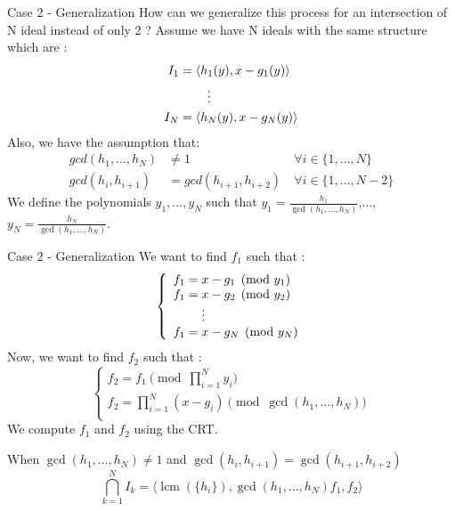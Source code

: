 \documentclass{beamer}
\DeclareMathOperator{\lcm}{lcm}
\begin{document}
\begin{frame}{Case 2 - Generalization}
How can we generalize this process for an intersection of N ideal instead of only 2 ?
Assume we have N ideals with the same structure which are :
\begin{align*}
    I_{1} & = \langle h_{1}(y),x-g_{1}(y) \rangle    \\
          & \hspace{8mm} \vdots                      \\
    I_{N} & = \langle h_{N}(y),x-g_{N}(y) \rangle
\end{align*}
Also, we have the assumption that: 
\begin{align*}
    gcd(h_{1},\dots,h_{N}) & \neq 1                 & \forall i \in \{1,\dots,N\} \\
    gcd(h_{i},h_{i+1})     & =gcd(h_{i+1},h_{i+2})\ & \forall i \in \{1,\dots,N-2\}
\end{align*}
 We define the polynomials $y_{1},\dots,y_{N}$ such that $y_{1} = \displaystyle \frac{h_{1}}{\gcd(h_{1},\dots,h_{N})}$,$\dots$, $y_{N} = \displaystyle \frac{h_{N}}{\gcd(h_{1},\dots,h_{N})}$.

\end{frame}

\begin{frame}{Case 2 - Generalization}
    We want to find $f_{1}$ such that :
\begin{displaymath}
    \left\{
    \begin{array}{ll}
        f_{1} = x-g_{1} \pmod {y_{1}} \\
        f_{1} = x-g_{2} \pmod {y_{2}} \\
        \hspace{8mm} \vdots \\
        f_{1} = x-g_{N} \pmod{y_{N}}\\
    \end{array}
    \right.
\end{displaymath}
    Now, we want to find $f_{2}$ such that :
\begin{displaymath}
    \left\{
    \begin{array}{ll}
        f_{2} = f_{1} \pmod {\prod_{i=1}^{N} y_{i}} \\
        f_{2} = \prod^{N}_{i=1} (x-g_{i}) \pmod {\gcd(h_{1},...,h_{N})} \\
    \end{array}
    \right.
\end{displaymath}
We compute $f_1$ and $f_2$ using the CRT.

\begin{theorem}
    When $\gcd(h_{1},\dots,h_{N})\neq 1$ and $\gcd(h_{i},h_{i+1}) = \gcd(h_{i+1},h_{i+2}) $
    \begin{displaymath}
        \bigcap_{k = 1}^{N} I_{k} = \langle \lcm(\{h_{i}\}), \gcd(h_{1},...,h_{N})f_{1},f_{2} \rangle
    \end{displaymath}
\end{theorem}
\end{frame}
\end{document}
